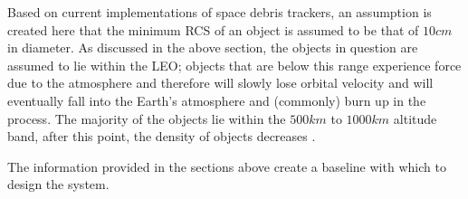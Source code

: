 \documentclass[11pt]{witseiepaper}
\begin{document}
\begin{bibunit}[witseie]
Based on current implementations of space debris trackers, an assumption is created here that the minimum RCS of an object is assumed to be that of $10 cm$ in diameter.
As discussed in the above section, the objects in question are assumed to lie within the LEO; objects that are below this range experience force due to the atmosphere and therefore will slowly lose orbital velocity and will eventually fall into the Earth's atmosphere and (commonly) burn up in the process.
The majority of the objects lie within the $500 km$ to $1000 km$ altitude band, after this point, the density of objects decreases \cite{ObjectInformation}.

The information provided in the sections above create a baseline with which to design the system.






\end{bibunit}
\end{document}
